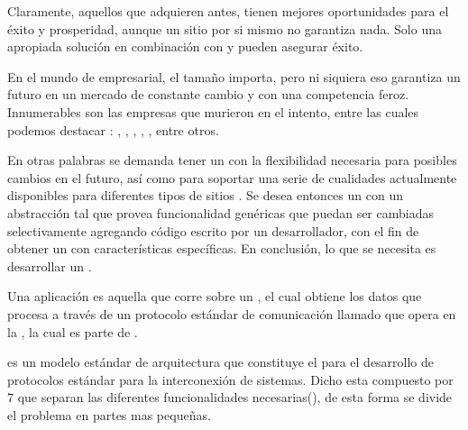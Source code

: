 Claramente, aquellos que adquieren \estores antes, tienen mejores oportunidades  para el éxito y prosperidad, aunque un sitio \ecommerce por si mismo no garantiza nada. Solo una apropiada solución \ecommerce en combinación con \emarketing y \advertising pueden asegurar éxito.


En el mundo de empresarial, el tamaño importa, pero ni siquiera eso garantiza un futuro en un mercado de constante cambio y con una competencia feroz. Innumerables son las empresas que murieron en el intento, entre las cuales podemos destacar : \sega, \kodak, \daewoo, \nokia, \blockbuster, entre otros.

En otras palabras se demanda tener un \ecommerce con la flexibilidad necesaria para posibles cambios en el futuro, así como para soportar una serie de cualidades actualmente disponibles para diferentes tipos de sitios \ecommerce. Se desea entonces un \software con un abstracción tal que provea funcionalidad genéricas que puedan ser cambiadas selectivamente agregando código escrito por un desarrollador, con el fin de obtener un \software \ecommerce con características específicas. En conclusión, lo que se necesita es desarrollar un \ecommerce \framework.

Una aplicación \web es aquella que corre sobre un \web \browser, el cual obtiene los datos que procesa a través de un protocolo estándar de comunicación llamado \http que opera en la \applayer, la cual es parte de \osimodel.

\osimodel es un modelo estándar de arquitectura que constituye el \framework para el desarrollo de protocolos estándar para la interconexión de sistemas. Dicho \framework esta compuesto por 7 \layers que separan las diferentes funcionalidades necesarias()\cite{inbook_osi_reference_model}, de esta forma se divide el problema en partes mas pequeñas.

